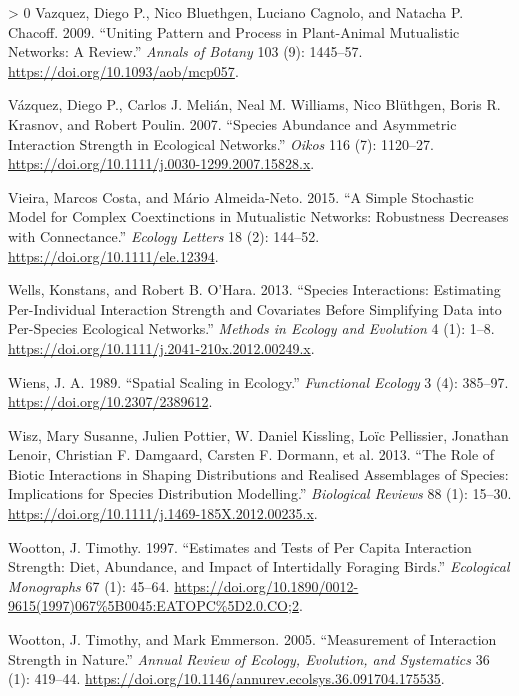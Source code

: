 \documentclass[10pt,oneside]{article}
\newlength{\cslhangindent}
\newenvironment{CSLReferences}[3] %
 {%
  \setlength{\parindent}{0pt}
  \ifodd #1 \everypar{\setlength{\hangindent}{\cslhangindent}}\ignorespaces\fi
  \ifnum #2 > 0
  \setlength{\parskip}{#2\baselineskip}
  \fi
 }%
 {}
\begin{document}
\begin{CSLReferences}{1}{0}
\leavevmode\hypertarget{ref-Vazquez2009UniPat}{}%
Vazquez, Diego P., Nico Bluethgen, Luciano Cagnolo, and Natacha P.
Chacoff. 2009. {``Uniting Pattern and Process in Plant-Animal
Mutualistic Networks: A Review.''} \emph{Annals of Botany} 103 (9):
1445--57. \url{https://doi.org/10.1093/aob/mcp057}.

\leavevmode\hypertarget{ref-Vazquez2007SpeAbu}{}%
Vázquez, Diego P., Carlos J. Melián, Neal M. Williams, Nico Blüthgen,
Boris R. Krasnov, and Robert Poulin. 2007. {``Species Abundance and
Asymmetric Interaction Strength in Ecological Networks.''} \emph{Oikos}
116 (7): 1120--27.
\url{https://doi.org/10.1111/j.0030-1299.2007.15828.x}.

\leavevmode\hypertarget{ref-Vieira2015SimSto}{}%
Vieira, Marcos Costa, and Mário Almeida-Neto. 2015. {``A Simple
Stochastic Model for Complex Coextinctions in Mutualistic Networks:
Robustness Decreases with Connectance.''} \emph{Ecology Letters} 18 (2):
144--52. \url{https://doi.org/10.1111/ele.12394}.

\leavevmode\hypertarget{ref-Wells2013SpeInt}{}%
Wells, Konstans, and Robert B. O'Hara. 2013. {``Species Interactions:
Estimating Per-Individual Interaction Strength and Covariates Before
Simplifying Data into Per-Species Ecological Networks.''} \emph{Methods
in Ecology and Evolution} 4 (1): 1--8.
\url{https://doi.org/10.1111/j.2041-210x.2012.00249.x}.

\leavevmode\hypertarget{ref-Wiens1989SpaSca}{}%
Wiens, J. A. 1989. {``Spatial Scaling in Ecology.''} \emph{Functional
Ecology} 3 (4): 385--97. \url{https://doi.org/10.2307/2389612}.

\leavevmode\hypertarget{ref-Wisz2013RolBio}{}%
Wisz, Mary Susanne, Julien Pottier, W. Daniel Kissling, Loïc Pellissier,
Jonathan Lenoir, Christian F. Damgaard, Carsten F. Dormann, et al. 2013.
{``The Role of Biotic Interactions in Shaping Distributions and Realised
Assemblages of Species: Implications for Species Distribution
Modelling.''} \emph{Biological Reviews} 88 (1): 15--30.
\url{https://doi.org/10.1111/j.1469-185X.2012.00235.x}.

\leavevmode\hypertarget{ref-Wootton1997EstTes}{}%
Wootton, J. Timothy. 1997. {``Estimates and Tests of Per Capita
Interaction Strength: Diet, Abundance, and Impact of Intertidally
Foraging Birds.''} \emph{Ecological Monographs} 67 (1): 45--64.
\url{https://doi.org/10.1890/0012-9615(1997)067\%5B0045:EATOPC\%5D2.0.CO;2}.

\leavevmode\hypertarget{ref-Wootton2005MeaInt}{}%
Wootton, J. Timothy, and Mark Emmerson. 2005. {``Measurement of
Interaction Strength in Nature.''} \emph{Annual Review of Ecology,
Evolution, and Systematics} 36 (1): 419--44.
\url{https://doi.org/10.1146/annurev.ecolsys.36.091704.175535}.


\end{CSLReferences}
\end{document}
